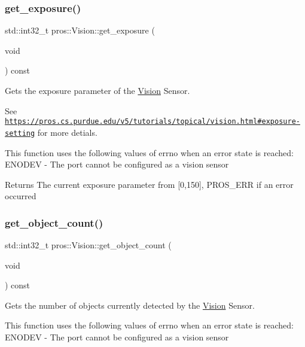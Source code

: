 \subsubsection{\texorpdfstring{get\+\_\+exposure()}{get\_exposure()}}
{\footnotesize\ttfamily std\+::int32\+\_\+t pros\+::\+Vision\+::get\+\_\+exposure (\begin{DoxyParamCaption}\item[{void}]{ }\end{DoxyParamCaption}) const}



Gets the exposure parameter of the \hyperlink{classpros_1_1Vision}{Vision} Sensor. 

See \href{https://pros.cs.purdue.edu/v5/tutorials/topical/vision.html#exposure-setting}{\tt https\+://pros.\+cs.\+purdue.\+edu/v5/tutorials/topical/vision.\+html\#exposure-\/setting} for more detials.

This function uses the following values of errno when an error state is reached\+: E\+N\+O\+D\+EV -\/ The port cannot be configured as a vision sensor

\begin{DoxyReturn}{Returns}
The current exposure parameter from \mbox{[}0,150\mbox{]}, P\+R\+O\+S\+\_\+\+E\+RR if an error occurred 
\end{DoxyReturn}
\mbox{\label{classpros_1_1Vision_a73869f85b3d2e468ffc51957d80f5a75}} 
\subsubsection{\texorpdfstring{get\+\_\+object\+\_\+count()}{get\_object\_count()}}
{\footnotesize\ttfamily std\+::int32\+\_\+t pros\+::\+Vision\+::get\+\_\+object\+\_\+count (\begin{DoxyParamCaption}\item[{void}]{ }\end{DoxyParamCaption}) const}



Gets the number of objects currently detected by the \hyperlink{classpros_1_1Vision}{Vision} Sensor. 

This function uses the following values of errno when an error state is reached\+: E\+N\+O\+D\+EV -\/ The port cannot be configured as a vision sensor

